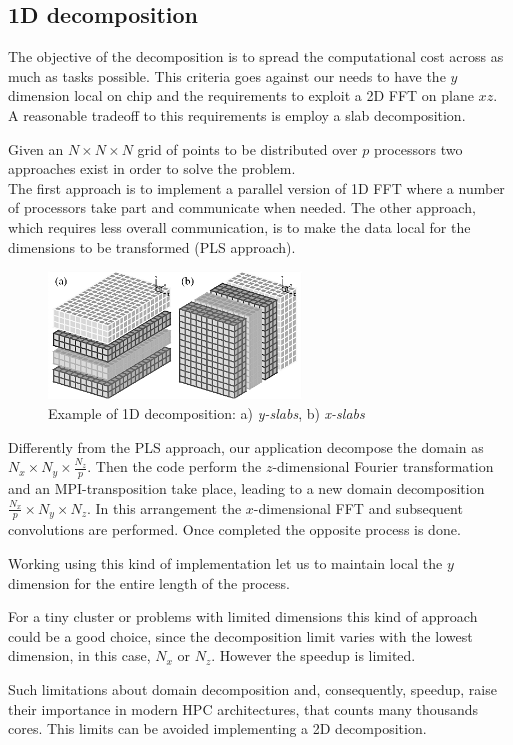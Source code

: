 \subsection{1D decomposition}
The objective of the decomposition is to spread the computational cost across as much as tasks possible. This criteria goes against our needs to have the $y$ dimension local on chip and the requirements to exploit a 2D FFT on plane $xz$.
A reasonable tradeoff to this requirements is employ a slab decomposition. 
\par
Given an $N\times N\times N$ grid of points to be distributed over $p$ processors two approaches exist in order to solve the problem.\\
The first approach is to implement a parallel version of 1D FFT where a number of processors take part and communicate when needed. The other approach, which requires less overall communication, is to make the data local for the dimensions to be transformed (PLS approach\cite{cpl:presentazione}). \\
\begin{figure}
\begin{center}
\includegraphics[width=0.6\textwidth]{grafici/1d_decomp}
\caption{Example of 1D decomposition: a) \emph{y-slabs},  b) \emph{x-slabs}}
\label{1d:decomp}
\end{center}
\end{figure}
\par
Differently from the PLS approach, our application decompose the domain as $N_{x}\times N_{y}\times \frac{N_{z}}{p}$. Then the code perform the $z$-dimensional Fourier transformation and an MPI-transposition take place, leading to a new domain decomposition $\frac{N_{x}}{p} \times N_{y}\times N_{z}$. In this arrangement the $x$-dimensional FFT and subsequent convolutions are performed. Once completed the opposite process is done. 
\par
Working using this kind of implementation let us to maintain local the $y$ dimension for the entire length of the process. 
\par
For a tiny cluster or problems with limited dimensions this kind of approach could be a good choice, since the decomposition limit varies with the lowest dimension, in this case, $N_{x}$ or $N_{z}$. However the speedup is limited. 
\par
Such limitations about domain decomposition and, consequently, speedup, raise their importance in modern HPC architectures, that counts many thousands cores.  
This limits can be avoided implementing a 2D decomposition.





